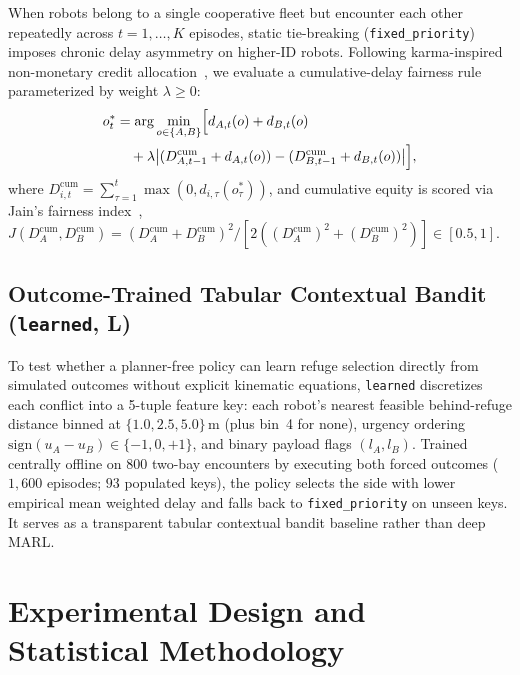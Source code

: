 \documentclass[letterpaper,journal]{IEEEtran}
\begin{document}
When robots belong to a single cooperative fleet but encounter each other repeatedly across $t=1,\dots,K$ episodes, static tie-breaking (\texttt{fixed\_priority}) imposes chronic delay asymmetry on higher-ID robots. Following karma-inspired non-monetary credit allocation~\cite{censi2019karma,elokda2024karma}, we evaluate a cumulative-delay fairness rule parameterized by weight $\lambda\ge 0$:
\begin{equation}
\begin{aligned}
o_t^\ast &= \arg\min_{o\in\{A,B\}} \Bigl[d_{A,t}(o)+d_{B,t}(o) \\
&\quad + \lambda\bigl|(D_{A,t-1}^{\mathrm{cum}}+d_{A,t}(o)) - (D_{B,t-1}^{\mathrm{cum}}+d_{B,t}(o))\bigr|\Bigr],
\end{aligned}
\label{eq:karma}
\end{equation}
where $D_{i,t}^{\mathrm{cum}} = \sum_{\tau=1}^{t}\max(0, d_{i,\tau}(o_\tau^\ast))$, and cumulative equity is scored via Jain's fairness index~\cite{jain1984fairness}, $J(D_A^{\mathrm{cum}},D_B^{\mathrm{cum}}) = (D_A^{\mathrm{cum}}+D_B^{\mathrm{cum}})^2 / [2((D_A^{\mathrm{cum}})^2+(D_B^{\mathrm{cum}})^2)] \in [0.5, 1]$.

\subsection{Outcome-Trained Tabular Contextual Bandit (\texttt{learned}, L)}
To test whether a planner-free policy can learn refuge selection directly from simulated outcomes without explicit kinematic equations, \texttt{learned} discretizes each conflict into a 5-tuple feature key: each robot's nearest feasible behind-refuge distance binned at $\{1.0, 2.5, 5.0\}$\,m (plus bin~4 for none), urgency ordering $\mathrm{sign}(u_A-u_B)\in\{-1,0,+1\}$, and binary payload flags $(l_A,l_B)$. Trained centrally offline on $800$ two-bay encounters by executing both forced outcomes ($1,600$ episodes; $93$ populated keys), the policy selects the side with lower empirical mean weighted delay and falls back to \texttt{fixed\_priority} on unseen keys. It serves as a transparent tabular contextual bandit baseline rather than deep MARL.

\section{Experimental Design and Statistical Methodology}\label{sec:exp}
\end{document}
